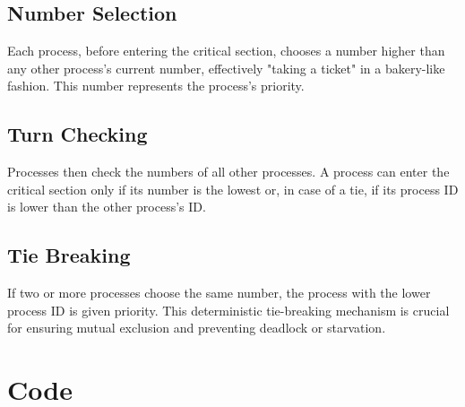 \documentclass{report}
\begin{document}
\subsection{Number Selection}

Each process, before entering the critical section, chooses a number higher than any other process's current number, effectively "taking a ticket" in a bakery-like fashion. This number represents the process's priority.

\subsection{Turn Checking}

Processes then check the numbers of all other processes. A process can enter the critical section only if its number is the lowest or, in case of a tie, if its process ID is lower than the other process's ID.

\subsection{Tie Breaking}

If two or more processes choose the same number, the process with the lower process ID is given priority. This deterministic tie-breaking mechanism is crucial for ensuring mutual exclusion and preventing deadlock or starvation.

\section{Code}
\end{document}
